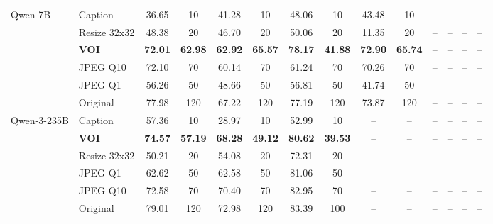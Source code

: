 \begin{table}[p]
{\begin{tabular}{llcccccccccccc}
\multirow{6}{*}{Qwen-7B}
& Caption        & 36.65 & 10 & 41.28 & 10 & 48.06 & 10& 43.48 & 10 & -- & -- & -- & -- \\
& Resize 32x32   & 48.38 & 20 & 46.70 & 20 & 50.06 & 20 & 11.35 & 20 & -- & -- & -- & -- \\
& \textbf{VOI}          & \textbf{72.01} & \textbf{62.98} & \textbf{62.92} & \textbf{65.57} & \textbf{78.17} & \textbf{41.88}& \textbf{72.90} & \textbf{65.74} & -- & -- & -- & -- \\
& JPEG Q10       & 72.10 & 70 & 60.14 & 70 & 61.24 & 70 & 70.26 & 70 & -- & -- & -- & -- \\
& JPEG Q1        & 56.26 & 50 & 48.66 & 50 & 56.81 & 50 & 41.74 & 50 & -- & -- & -- & -- \\
& Original       & 77.98 & 120 & 67.22 & 120 & 77.19 & 120 & 73.87 & 120 & -- & -- & -- & -- \\
\midrule

\multirow{6}{*}{Qwen-3-235B}
& Caption        & 57.36 & 10 & 28.97 & 10 & 52.99 & 10 & -- & -- & -- & -- & -- & -- \\
& \textbf{VOI}          & \textbf{74.57} & \textbf{57.19} & \textbf{68.28} & \textbf{49.12} & \textbf{80.62} & \textbf{39.53} & -- & -- & -- & -- & -- & -- \\
& Resize 32x32   & 50.21 & 20 & 54.08 & 20 & 72.31 & 20 & -- & -- & -- & -- & -- & -- \\
& JPEG Q1        & 62.62 & 50 & 62.58 & 50 & 81.06 & 50 & -- & -- & -- & -- & -- & -- \\
& JPEG Q10       & 72.58 & 70 & 70.40 & 70 & 82.95 & 70 & -- & -- & -- & -- & -- & -- \\
& Original       & 79.01 & 120 & 72.98 & 120 & 83.39 & 100 & -- & -- & -- & -- & -- & -- \\

\bottomrule
\end{tabular}
}
\end{table}



